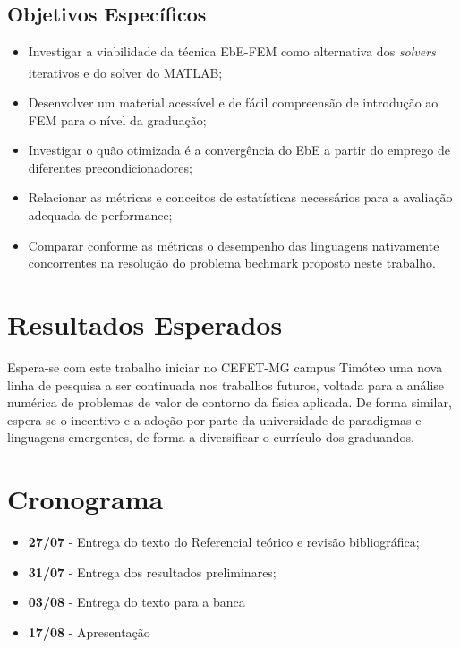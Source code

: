 \documentclass[
    12pt,               %
    openright,          %
    oneside,
    a4paper,            %
    english,            %
    french,             %
    spanish,            %
    brazil              %
    ]{abntex2}
\newcommand{\matlab}{MATLAB\textsuperscript{\textregistered}}
\begin{document}
\section{Objetivos Específicos}

	\begin{itemize}
		\item Investigar a viabilidade da técnica EbE-FEM como alternativa dos \textit{solvers} iterativos e do solver do  \matlab;
		\item Desenvolver um material acessível e de fácil compreensão de introdução ao FEM para o nível da graduação;
		\item Investigar o quão otimizada é a convergência do EbE a partir do emprego de diferentes precondicionadores;		
		\item Relacionar as métricas e conceitos de estatísticas necessários para a avaliação adequada de performance;
		\item Comparar conforme as métricas o desempenho das linguagens nativamente concorrentes na resolução do problema bechmark proposto neste trabalho.
	\end{itemize}

\chapter{Resultados Esperados}

Espera-se com este trabalho iniciar no CEFET-MG campus Timóteo uma nova linha de pesquisa a ser continuada nos trabalhos futuros, voltada para a análise numérica de problemas de valor de contorno da física aplicada. De forma similar, espera-se o incentivo e a adoção por parte da universidade de paradigmas e linguagens emergentes, de forma a diversificar o currículo dos graduandos.


\chapter{Cronograma}
	\begin{itemize}
		\item \textbf{27/07} - Entrega do texto do Referencial teórico e revisão bibliográfica;
		\item \textbf{31/07} - Entrega dos resultados preliminares;	
		\item \textbf{03/08} - Entrega do texto para a banca
		\item \textbf{17/08}  - Apresentação					
	\end{itemize}
\end{document}
